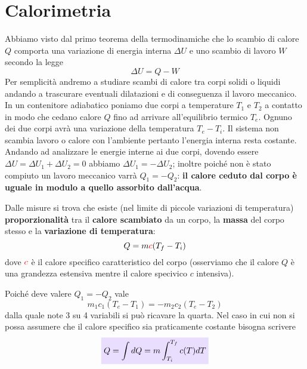 \documentclass[x11names]{report}
\newcommand{\viola}[1]{\colorbox{yred}{$\displaystyle #1$}}
\begin{document}
	
	\section{Calorimetria}
	Abbiamo visto dal primo teorema della termodinamiche che lo scambio di calore \(Q\) comporta una variazione di energia interna \(\Delta U\) e uno scambio di lavoro \(W\) secondo la legge
	\[ 
	\Delta U = Q -W
	\]
	Per semplicità andremo a studiare scambi di calore tra corpi solidi o liquidi andando a trascurare eventuali dilatazioni e di conseguenza il lavoro meccanico. \\
	
	\noindent
	In un contenitore adiabatico poniamo due corpi a temperature \(T_1\) e \(T_2\) a contatto  in modo che cedano calore \(Q\) fino ad arrivare all'equilibrio termico \(T_e\). Ognuno dei due corpi avrà una variazione della temperatura \(T_{e} - T_i\). 
	Il sistema non scambia lavoro o calore con l'ambiente pertanto l'energia interna resta costante. Andando ad analizzare le energie interne ai due corpi, dovendo essere \(\Delta U = \Delta U_1 + \Delta U_2 = 0\) abbiamo \(\Delta U_1 = -\Delta U_2\); inoltre poiché non è stato compiuto un lavoro meccanico varrà \(Q_1 = -Q_2\): \textbf{il calore ceduto dal corpo è uguale in modulo a quello assorbito dall'acqua}.
	
	
	Dalle misure si trova che esiste (nel limite di piccole variazioni di temperatura) \textbf{proporzionalità} tra il \textbf{calore scambiato} da un corpo, la \textbf{massa} del corpo stesso e la \textbf{variazione di temperatura}:
	\[ 
	Q = m \textcolor{red}{c}(T_f - T_i)
	\]
	dove \(\textcolor{red}{c}\) è il calore specifico caratteristico del corpo (osserviamo che il calore \(Q\) è una grandezza estensiva mentre il calore specivico \(c\) intensiva).
	
	Poiché deve valere \(Q_1 = -Q_2\) vale
	\[ 
	m_1 c_1(T_e - T_1) = -m_2 c_2(T_e - T_2)
	\]
	dalla quale note 3 su 4 variabili si può ricavare la quarta. Nel caso in cui non si possa assumere che il calore specifico sia praticamente costante bisogna scrivere
	\begin{equation}
		\viola{Q = \int dQ = m \int_{T_i}^{T_{f}}c(T)dT}
	\end{equation}
	
	
\end{document}
